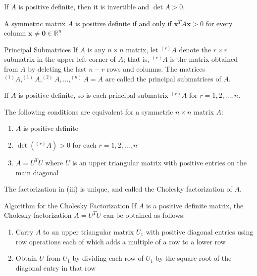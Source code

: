 \documentclass[12pt]{article}
\begin{document}
\begin{theorem}{}{}
    If $ A $ is positive definite, then it is invertible and $ \det A > 0 $.
\end{theorem}

\begin{theorem}{}{}
    A symmetric matrix $ A $ is positive definite if and only if $ \mathbf{x}^T A \mathbf{x} > 0 $ for every column $ \mathbf{x} \neq \mathbf{0} \in \mathbb{R}^n $
\end{theorem}

\begin{definition}{Principal Submatrices}{}
    If $ A $ is any $ n \times n $ matrix, let $ ^{\left( r \right)} A $ denote the $ r \times r $ submatrix in the upper left corner of $ A $; that is, $ ^{\left( r \right)} A $ is the matrix obtained from $ A $ by deleting the last $ n - r $ rows and columns. The matrices $ ^{\left( 1 \right)} A, ^{\left( 1 \right)} A, ^{\left( 2 \right)} A, \dots, ^{\left( n \right)} A = A $ are called the principal submatrices of $ A $.
\end{definition}

\begin{lemma}{}{}
    If $ A $ is positive definite, so is each principal submatrix $ ^{\left( r \right)} A $ for $ r = 1, 2, \dots, n $.
\end{lemma}

\begin{theorem}{}{}
    The following conditions are equivalent for a symmetric $ n \times n $ matrix $ A $:
    \begin{enumerate}[label=(\roman*)]
        \item $ A $ is positive definite
        \item $ \det \left( ^{\left( r \right)} A \right) > 0 $ for each $ r = 1, 2, \dots, n $
        \item $ A = U^T U $ where $ U $ is an upper triangular matrix with positive entries on the main diagonal
    \end{enumerate}
    The factorization in (iii) is unique, and called the Cholesky factorization of $ A $.
\end{theorem}

\begin{theorem}{Algorithm for the Cholesky Factorization}{}
    If $ A $ is a positive definite matrix, the Cholesky factorization $ A = U^T U $ can be obtained as follows:
    \begin{enumerate}
        \item Carry $ A $ to an upper triangular matrix $ U_1 $ with positive diagonal entries using row operations each of which adds a multiple of a row to a lower row
        \item Obtain $ U $ from $ U_1 $ by dividing each row of $ U_1 $ by the square root of the diagonal entry in that row
    \end{enumerate}
\end{theorem}
\end{document}

